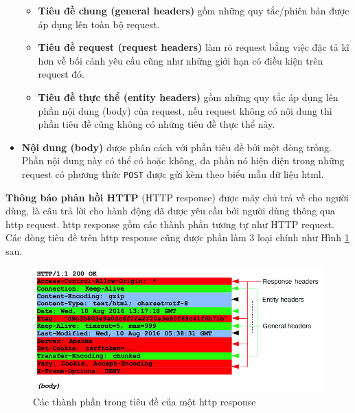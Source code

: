 \begin{itemize}
        \begin{itemize}
            \item \textbf{Tiêu đề chung (general headers)} gồm những quy tắc/phiên bản được áp dụng lên toàn bộ request.
            \item \textbf{Tiêu đề request (request headers)} làm rõ request bằng việc đặc tả kĩ hơn về bối cảnh yêu cầu cũng như những giới hạn có điều kiện trên request đó.
            \item \textbf{Tiêu đề thực thể (entity headers)} gồm những quy tắc áp dụng lên phần nội dung (body) của request, nếu request không có nội dung thì phần tiêu đề cũng không có những tiêu đề thực thể này.
        \end{itemize}
    \item \textbf{Nội dung (body)} được phân cách với phần tiêu đề bởi một dòng trống. Phần nội dung này có thể có hoặc không, đa phần nó hiện diện trong những request có phương thức \texttt{POST} được gửi kèm theo biểu mẫu dữ liệu \acrshort{html}.
\end{itemize}
\textbf{Thông báo phản hồi HTTP} (HTTP response) được máy chủ trả về  cho người dùng, là câu trả lời cho hành động đã được yêu cầu bởi người dùng thông qua \acrshort{http} request. \acrshort{http} response gồm các thành phần tương tự như HTTP request. Các dòng tiêu đề trên \acrshort{http} response cũng được phần làm 3 loại chính như Hình \ref{fig:HTTP-response-headers} sau.
\begin{figure}[H]
  \centering
    \includegraphics[width=\textwidth,keepaspectratio=true]{images/HTTP-response-headers.png}
  \caption[Các thành phần trong tiêu đề của một \acrshort{http} response]{Các thành phần trong tiêu đề của một \acrshort{http} response \protect\parencite{mdn-HTTP-message}}
  \label{fig:HTTP-response-headers}
\end{figure}

